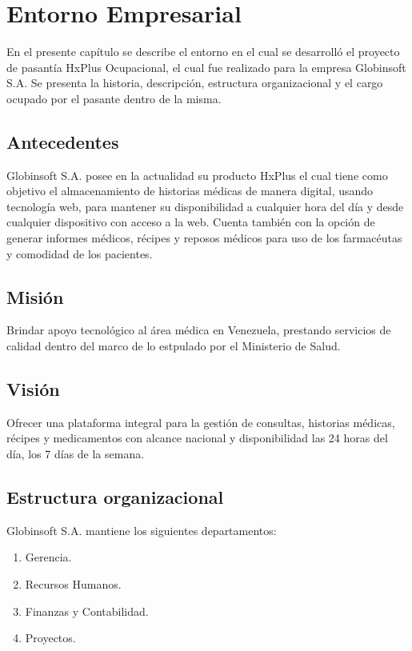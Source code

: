 \chapter{Entorno Empresarial}

En el presente capítulo se describe el entorno en el cual se desarrolló el proyecto de pasantía HxPlus Ocupacional, el cual fue realizado para la empresa Globinsoft S.A. Se presenta la historia, descripción, estructura organizacional y el cargo ocupado por el pasante dentro de la misma.

    \section{Antecedentes}
    Globinsoft S.A. posee en la actualidad su producto HxPlus el cual tiene como objetivo el almacenamiento de historias médicas de manera digital, usando tecnología web, para mantener su disponibilidad a cualquier hora del día y desde cualquier dispositivo con acceso a la web. Cuenta también con la opción de generar informes médicos, récipes y reposos médicos para uso de los farmacéutas y comodidad de los pacientes.
    
    
    \section{Misión}
    
    Brindar apoyo tecnológico al área médica en Venezuela, prestando servicios de calidad dentro del marco de lo estpulado por el Ministerio de Salud.
    
    \section{Visión}
    
    Ofrecer una plataforma integral para la gestión de consultas, historias médicas, récipes y medicamentos con alcance nacional y disponibilidad las 24 horas del día, los 7 días de la semana.
    
    \section{Estructura organizacional}
    
    Globinsoft S.A. mantiene los siguientes departamentos:
    
    \begin{enumerate}
        \item Gerencia.
        \item Recursos Humanos.
        \item Finanzas y Contabilidad.
        \item Proyectos.
    \end{enumerate}
    
